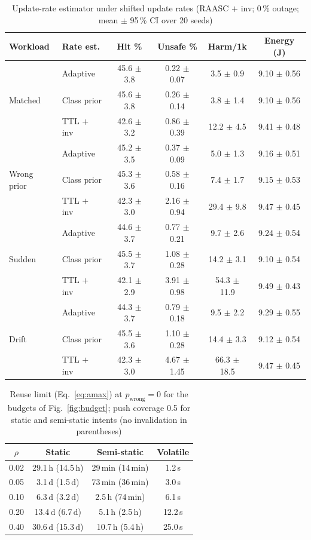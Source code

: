 \documentclass[journal]{IEEEtran}
\newcommand{\pct}{\,\%}
\begin{document}
\begin{table}[!t]
\caption{Update-rate estimator under shifted update rates (RAASC $+$ inv; 0\pct{} outage; mean $\pm$ 95\pct{} CI over 20 seeds)}
\label{tab:shift}
\centering\scriptsize
\setlength{\tabcolsep}{2pt}
\begin{tabular}{llcccc}
\toprule
Workload & Rate est. & Hit \% & Unsafe \% & Harm/1k & Energy (J)\\
\midrule
\multirow{3}{*}{Matched} & Adaptive & 45.6 $\pm$ 3.8 & 0.22 $\pm$ 0.07 & 3.5 $\pm$ 0.9 & 9.10 $\pm$ 0.56\\
 & Class prior & 45.6 $\pm$ 3.8 & 0.26 $\pm$ 0.14 & 3.8 $\pm$ 1.4 & 9.10 $\pm$ 0.56\\
 & TTL $+$ inv & 42.6 $\pm$ 3.2 & 0.86 $\pm$ 0.39 & 12.2 $\pm$ 4.5 & 9.41 $\pm$ 0.48\\
\midrule
\multirow{3}{*}{Wrong prior} & Adaptive & 45.2 $\pm$ 3.5 & 0.37 $\pm$ 0.09 & 5.0 $\pm$ 1.3 & 9.16 $\pm$ 0.51\\
 & Class prior & 45.3 $\pm$ 3.6 & 0.58 $\pm$ 0.16 & 7.4 $\pm$ 1.7 & 9.15 $\pm$ 0.53\\
 & TTL $+$ inv & 42.3 $\pm$ 3.0 & 2.16 $\pm$ 0.94 & 29.4 $\pm$ 9.8 & 9.47 $\pm$ 0.45\\
\midrule
\multirow{3}{*}{Sudden} & Adaptive & 44.6 $\pm$ 3.7 & 0.77 $\pm$ 0.21 & 9.7 $\pm$ 2.6 & 9.24 $\pm$ 0.54\\
 & Class prior & 45.5 $\pm$ 3.7 & 1.08 $\pm$ 0.28 & 14.2 $\pm$ 3.1 & 9.10 $\pm$ 0.54\\
 & TTL $+$ inv & 42.1 $\pm$ 2.9 & 3.91 $\pm$ 0.98 & 54.3 $\pm$ 11.9 & 9.49 $\pm$ 0.43\\
\midrule
\multirow{3}{*}{Drift} & Adaptive & 44.3 $\pm$ 3.7 & 0.79 $\pm$ 0.18 & 9.5 $\pm$ 2.2 & 9.29 $\pm$ 0.55\\
 & Class prior & 45.5 $\pm$ 3.6 & 1.10 $\pm$ 0.28 & 14.4 $\pm$ 3.3 & 9.12 $\pm$ 0.54\\
 & TTL $+$ inv & 42.3 $\pm$ 3.0 & 4.67 $\pm$ 1.45 & 66.3 $\pm$ 18.5 & 9.47 $\pm$ 0.45\\
\bottomrule
\end{tabular}
\end{table}

\begin{table}[!t]
\caption{Reuse limit (Eq.~\eqref{eq:amax}) at $p_{\text{wrong}}=0$ for the budgets of Fig.~\ref{fig:budget}; push coverage 0.5 for static and semi-static intents (no invalidation in parentheses)}
\label{tab:limits}
\centering\footnotesize
\setlength{\tabcolsep}{3pt}
\begin{tabular}{cccc}
\toprule
$\rho$ & Static & Semi-static & Volatile\\
\midrule
0.02 & 29.1\,h (14.5\,h) & 29\,min (14\,min) & 1.2\,s\\
0.05 & 3.1\,d (1.5\,d) & 73\,min (36\,min) & 3.0\,s\\
0.10 & 6.3\,d (3.2\,d) & 2.5\,h (74\,min) & 6.1\,s\\
0.20 & 13.4\,d (6.7\,d) & 5.1\,h (2.5\,h) & 12.2\,s\\
0.40 & 30.6\,d (15.3\,d) & 10.7\,h (5.4\,h) & 25.0\,s\\
\bottomrule
\end{tabular}
\end{table}
\end{document}
